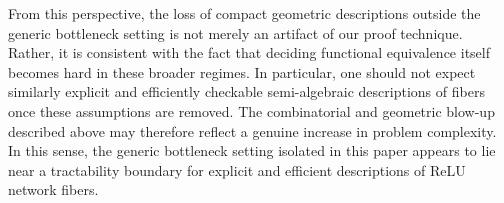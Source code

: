 \documentclass{article}
\theoremstyle{definition}
\begin{document}
From this perspective, the loss of compact geometric descriptions outside the generic bottleneck setting is not merely an artifact of our proof technique. 
Rather, it is consistent with the fact that deciding functional equivalence itself becomes hard in these broader regimes. 
In particular, one should not expect similarly explicit and efficiently checkable semi-algebraic descriptions of fibers once these assumptions are removed. 
%
The combinatorial and geometric blow-up described above may therefore reflect a genuine increase in problem complexity. 
In this sense, the generic bottleneck setting isolated in this paper appears to lie near a tractability boundary for explicit and efficient descriptions of ReLU network fibers. 


% 
\end{document}
